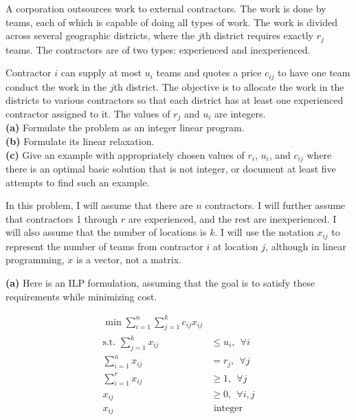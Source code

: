 \documentclass[fleqn]{homework}
\begin{document}
  \begin{problem}{7}
    \begin{question}
      A corporation outsources work to external contractors.  The work is done
      by teams, each of which is capable of doing all types of work.  The work
      is divided across several geographic districts, where the $j$th district
      requires exactly $r_j$ teams.  The contractors are of two types:
      experienced and inexperienced.

      Contractor $i$ can supply at most $u_i$ teams and quotes a price $c_{ij}$
      to have one team conduct the work in the $j$th district.  The objective is
      to allocate the work in the districts to various contractors so that each
      district has at least one experienced contractor assigned to it.  The
      values of $r_j$ and $u_i$ are integers.\\
      \textbf{(a)} Formulate the problem as an integer linear program.\\
      \textbf{(b)} Formulate its linear relaxation.\\
      \textbf{(c)} Give an example with appropriately chosen values of $r_i$,
    $u_i$, and $c_{ij}$ where there is an optimal basic solution that is not
    integer, or document at least five attempts to find such an example.
    \end{question}

    In this problem, I will assume that there are $n$ contractors.  I will
    further assume that contractors 1 through $r$ are experienced, and the rest
    are inexperienced.  I will also assume that the number of locations is $k$.
    I will use the notation $x_{ij}$ to represent the number of teams from
    contractor $i$ at location $j$, although in linear programming, $x$ is a
    vector, not a matrix.

    \textbf{(a)} Here is an ILP formulation, assuming that the goal is to
    satisfy these requirements while minimizing cost.

    \begin{align*}
      \min \sum_{i=1}^n \sum_{j=1}^k c_{ij} x_{ij} & \\
      \text{s.t. } \sum_{j=1}^k x_{ij} &\leq u_i, \:\: \forall i \\
      \sum_{i=1}^n x_{ij} &= r_j, \:\: \forall j \\
      \sum_{i=1}^r x_{ij} &\geq 1, \:\: \forall j \\
      x_{ij} &\geq 0, \:\: \forall i,j \\
      x_{ij} &\text{ integer}
    \end{align*}


\end{problem}
\end{document}
